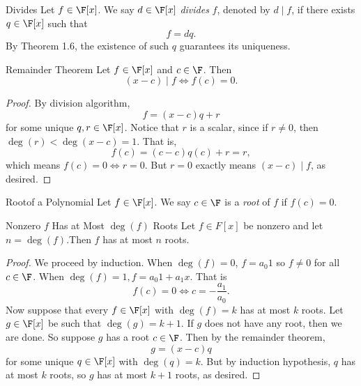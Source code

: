 \documentclass[linearalgebraII]{subfiles}
\begin{document}
    \begin{definition}{Divides}{}
        Let $f\in \F[x]$. We say $d\in \F[x]$ \emph{divides} $f$, denoted by $d\mid f$, if there exists $q\in\F[x]$ such that
        \begin{equation*}
            f = dq.
        \end{equation*}
        By Theorem 1.6, the existence of such $q$ guarantees its uniqueness. 
    \end{definition}

    \begin{cor}{Remainder Theorem}
        Let $f\in \F[x]$ and $c\in \F$. Then
        \begin{equation*}
            (x-c)\mid f \iff f(c) = 0.
        \end{equation*}
    \end{cor}

    \begin{proof}
        By division algorithm,
        \begin{equation*}
            f = (x-c)q + r
        \end{equation*}
        for some unique $q,r\in \F[x]$. Notice that $r$ is a scalar, since if $r\neq 0$, then $\deg(r)< \deg(x-c) = 1$. That is,
        \begin{equation*}
            f(c) = (c-c)q(c)+r = r,
        \end{equation*}
        which means $f(c) = 0 \iff r = 0$. But $r=0$ exactly means $(x-c)\mid f$, as desired.
    \end{proof}

    \begin{definition}{Root}{of a Polynomial}
        Let $f\in \F[x]$. We say $c\in \F$ is a \emph{root} of $f$ if $f(c) = 0$.
    \end{definition}

    \begin{cor}{Nonzero $f$ Has at Most $\deg(f)$ Roots}
        Let $f\in F[x]$ be nonzero and let $n=\deg(f)$.Then $f$ has at most $n$ roots.
    \end{cor}

    \begin{proof}
        We proceed by induction. When $\deg(f) = 0$, $f = a_0 1$ so $f\neq 0$ for all $c\in \F$. When $\deg(f) = 1, f = a_0 1+a_1x$. That is
        \begin{equation*}
            f(c) = 0 \iff c = -\frac{a_1}{a_0}.
        \end{equation*}
        Now suppose that every $f\in \F[x]$ with $\deg(f) = k$ has at most $k$ roots. Let $g\in \F[x]$ be such that $\deg(g) = k+1$. If $g$ does not have any root, then we are done. So suppose $g$ has a root $c\in \F$. Then by the remainder theorem,
        \begin{equation*}
            g = (x-c)q
        \end{equation*}
        for some unique $q\in \F[x]$ with $\deg(q) = k$. But by induction hypothesis, $q$ has at most $k$ roots, so $g$ has at most $k+1$ roots, as desired.
    \end{proof}
\end{document}
